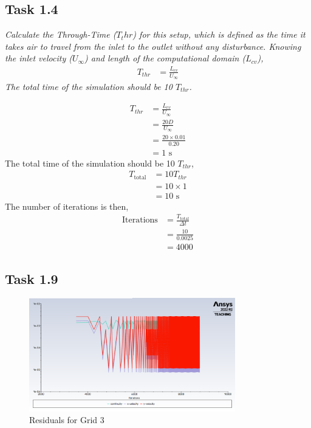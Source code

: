\subsection{Task 1.4}
\textit{Calculate the Through-Time ($T_thr$) for this setup, which is defined as the time it takes air to travel from the inlet to the outlet without any disturbance. Knowing the inlet velocity ($U_\infty$) and length of the computational domain ($L_{cv}$),}
\begin{align*}
    T_{thr} &= \frac{L_{cv}}{U_\infty}
\end{align*}
\textit{The total time of the simulation should be 10 $T_{thr}$.}

\begin{align*}
    T_{thr} &= \frac{L_{cv}}{U_\infty} \\
    &= \frac{20D}{U_\infty} \\
    &= \frac{20 \times 0.01}{0.20} \\
    &= \boxed{1} \text{ s}
\end{align*}
The total time of the simulation should be 10 $T_{thr}$,
\begin{align*}
    T_{\text{total}} &= 10 T_{thr} \\
    &= 10 \times 1 \\
    &= \boxed{10} \text{ s}
\end{align*}
The number of iterations is then,
\begin{align*}
    \text{Iterations} &= \frac{T_{\text{total}}}{\Delta t} \\
    &= \frac{10}{0.0025} \\
    &= \boxed{4000}
\end{align*}

\subsection{Task 1.9}
\begin{figure}[H]
    \centering
    \includegraphics[width=0.8\textwidth]{Questions/Figures/residuals plot grid 3.png}
    \caption{Residuals for Grid 3}
\end{figure}

